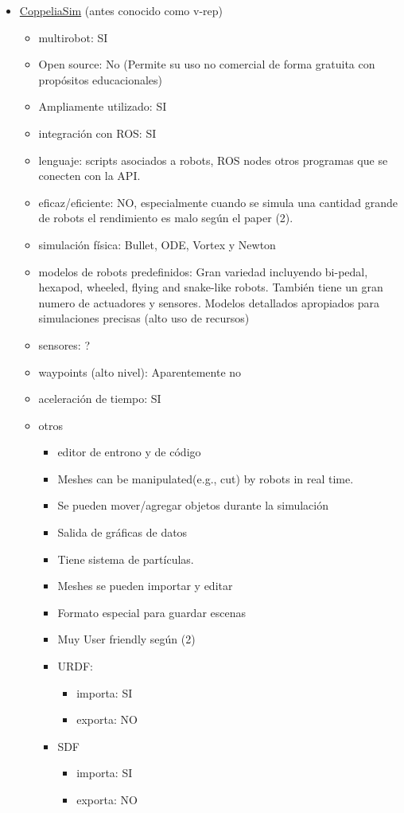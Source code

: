 \begin{itemize}
  \item \href{https://www.coppeliarobotics.com}{CoppeliaSim} (antes conocido como v-rep) 
  \begin{itemize}
    \item multirobot:                     SI
    \item Open source:                    No (Permite su uso no comercial de forma gratuita con propósitos educacionales)
    \item Ampliamente utilizado:          SI
    \item integración con ROS:            SI
    \item lenguaje:                       scripts asociados a robots, ROS nodes otros programas que se conecten con la API. 
    \item eficaz/eficiente:               NO, especialmente cuando se simula una cantidad grande de robots el rendimiento es malo según el paper (2).
    \item simulación física:              Bullet, ODE, Vortex y Newton 
    \item modelos de robots predefinidos: Gran variedad incluyendo bi-pedal, hexapod, wheeled, flying and snake-like robots. También tiene un gran numero de actuadores y sensores.  Modelos detallados apropiados para simulaciones precisas (alto uso de recursos)
    \item sensores:                       ?
    \item waypoints (alto nivel):         Aparentemente no 
    \item aceleración de tiempo:          SI
    \item otros
    \begin{itemize}
      \item editor de entrono y de código
      \item Meshes can be manipulated(e.g., cut) by robots in real time.
      \item Se pueden mover/agregar objetos durante la simulación
      \item Salida de gráficas de datos
      \item Tiene sistema de partículas. 
      \item Meshes se pueden importar y editar
      \item Formato especial para guardar escenas
      \item Muy User friendly según (2)
      \item URDF:
      \begin{itemize}
        \item importa:                      SI
        \item exporta:                      NO 
      \end{itemize}
      \item SDF
      \begin{itemize}
        \item importa:                       SI
        \item exporta:                      NO 
      \end{itemize}
    \end{itemize}
  \end{itemize}
  

\end{itemize}
